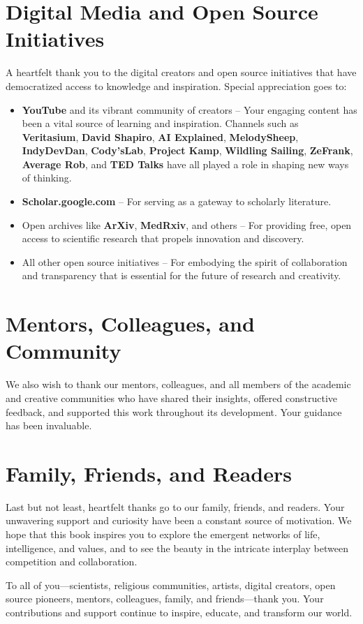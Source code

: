 \section*{Digital Media and Open Source Initiatives}
A heartfelt thank you to the digital creators and open source initiatives that have democratized access to knowledge and inspiration. Special appreciation goes to:
\begin{itemize}
    \item \textbf{YouTube} and its vibrant community of creators – Your engaging content has been a vital source of learning and inspiration. Channels such as \textbf{Veritasium}, \textbf{David Shapiro}, \textbf{AI Explained}, \textbf{MelodySheep}, \textbf{IndyDevDan}, \textbf{Cody’sLab}, \textbf{Project Kamp}, \textbf{Wildling Sailing}, \textbf{ZeFrank}, \textbf{Average Rob}, and \textbf{TED Talks} have all played a role in shaping new ways of thinking.
    \item \textbf{Scholar.google.com} – For serving as a gateway to scholarly literature.
    \item Open archives like \textbf{ArXiv}, \textbf{MedRxiv}, and others – For providing free, open access to scientific research that propels innovation and discovery.
    \item All other open source initiatives – For embodying the spirit of collaboration and transparency that is essential for the future of research and creativity.
\end{itemize}

\section*{Mentors, Colleagues, and Community}
We also wish to thank our mentors, colleagues, and all members of the academic and creative communities who have shared their insights, offered constructive feedback, and supported this work throughout its development. Your guidance has been invaluable.

\section*{Family, Friends, and Readers}
Last but not least, heartfelt thanks go to our family, friends, and readers. Your unwavering support and curiosity have been a constant source of motivation. We hope that this book inspires you to explore the emergent networks of life, intelligence, and values, and to see the beauty in the intricate interplay between competition and collaboration.

\bigskip
To all of you—scientists, religious communities, artists, digital creators, open source pioneers, mentors, colleagues, family, and friends—thank you. Your contributions and support continue to inspire, educate, and transform our world.
\cleardoublepage
